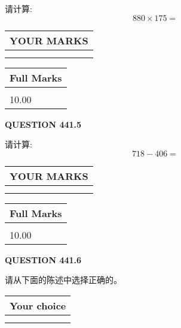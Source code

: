 \documentclass{ctexart}
\begin{document}
  
 
请计算:
\begin{equation}
880  \times    %
175 = \nonumber
\end{equation}
 

 

 
  
\vspace{0.2in}
  
\noindent\begin{tabular}{|l|}
\hline
 YOUR MARKS  \\
\hline
 \\ 
 \\ 
\hline
\end{tabular}
\hspace{0.05in} \begin{tabular}{|l|}
\hline
 Full Marks  \\
\hline
 \\ 
10.00 \\
\hline
\end{tabular}
{\textbf{\Large{QUESTION
441.5 
}}}
  
  
 
请计算:
\begin{equation}
718 -   %
406 = \nonumber
\end{equation}
 

 

 
  
\vspace{0.2in}
  
\noindent\begin{tabular}{|l|}
\hline
 YOUR MARKS  \\
\hline
 \\ 
 \\ 
\hline
\end{tabular}
\hspace{0.05in} \begin{tabular}{|l|}
\hline
 Full Marks  \\
\hline
 \\ 
10.00 \\
\hline
\end{tabular}
{\textbf{\Large{QUESTION
441.6 
}}}
  
  
请从下面的陈述中选择正确的。
  
  
\noindent\hspace{3.0in} \begin{tabular}{|l|}
\hline
Your choice \\
\hline
 \\ 
 \\ 
\hline
\end{tabular}
  
\end{document}
